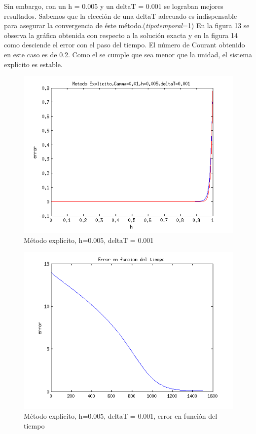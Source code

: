 \documentclass[11pt]{article}
\begin{document}
\bigskip Sin embargo, con un h = 0.005 y un deltaT = 0.001 se lograban mejores resultados. Sabemos que la elecci\'on de una deltaT adecuado es indispensable para asegurar la convergencia de \'este m\'etodo.(\textit{tipotemporal}=1) En la figura 13 se observa la gr\'afica obtenida con respecto a la soluci\'on exacta y en la figura 14 como desciende el error con el paso del tiempo. El n\'umero de Courant obtenido en este caso es de 0.2. Como el se cumple que sea menor que la unidad, el sistema expl\'icito es estable.

\begin{figure}[tbh]
	\centering
		\includegraphics[width=1.0\textwidth]{imagen13.png}
	\caption{M\'etodo expl\'icito, h=0.005, deltaT = 0.001}
	\label{fig:Fig1}
\end{figure}

\begin{figure}[tbh]
	\centering
		\includegraphics[width=1.0\textwidth]{imagen14.png}
	\caption{M\'etodo expl\'icito, h=0.005, deltaT = 0.001, error en funci\'on del tiempo}
	\label{fig:Fig1}
\end{figure}
\end{document}
